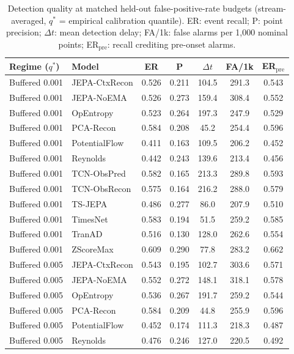 \begin{table}[t]
\centering
\scriptsize
\caption{Detection quality at matched held-out false-positive-rate budgets (stream-averaged, $q^*$ = empirical calibration quantile). ER: event recall; P: point precision; $\Delta t$: mean detection delay; FA/1k: false alarms per 1{,}000 nominal points; ER$_{\mathrm{pre}}$: recall crediting pre-onset alarms.}\label{tab:matched_fpr}
\begin{tabular}{@{}llccccc@{}}
\toprule
Regime ($q^*$) & Model & ER & P & $\Delta t$ & FA/1k & ER$_{\mathrm{pre}}$ \\
\midrule
Buffered 0.001 & JEPA-CtxRecon & 0.526 & 0.211 & 104.5 & 291.3 & 0.543 \\
Buffered 0.001 & JEPA-NoEMA & 0.526 & 0.273 & 159.4 & 308.4 & 0.552 \\
Buffered 0.001 & OpEntropy & 0.523 & 0.264 & 197.3 & 247.9 & 0.529 \\
Buffered 0.001 & PCA-Recon & 0.584 & 0.208 & 45.2 & 254.4 & 0.596 \\
Buffered 0.001 & PotentialFlow & 0.411 & 0.163 & 109.5 & 206.2 & 0.452 \\
Buffered 0.001 & Reynolds & 0.442 & 0.243 & 139.6 & 213.4 & 0.456 \\
Buffered 0.001 & TCN-ObsPred & 0.582 & 0.165 & 213.3 & 289.8 & 0.593 \\
Buffered 0.001 & TCN-ObsRecon & 0.575 & 0.164 & 216.2 & 288.0 & 0.579 \\
Buffered 0.001 & TS-JEPA & 0.486 & 0.277 & 86.0 & 207.9 & 0.510 \\
Buffered 0.001 & TimesNet & 0.583 & 0.194 & 51.5 & 259.2 & 0.585 \\
Buffered 0.001 & TranAD & 0.516 & 0.130 & 128.0 & 262.6 & 0.554 \\
Buffered 0.001 & ZScoreMax & 0.609 & 0.290 & 77.8 & 283.2 & 0.662 \\
Buffered 0.005 & JEPA-CtxRecon & 0.543 & 0.195 & 102.7 & 303.6 & 0.571 \\
Buffered 0.005 & JEPA-NoEMA & 0.552 & 0.272 & 148.1 & 318.1 & 0.578 \\
Buffered 0.005 & OpEntropy & 0.536 & 0.267 & 191.7 & 259.2 & 0.544 \\
Buffered 0.005 & PCA-Recon & 0.584 & 0.209 & 44.8 & 255.9 & 0.596 \\
Buffered 0.005 & PotentialFlow & 0.452 & 0.174 & 111.3 & 218.3 & 0.487 \\
Buffered 0.005 & Reynolds & 0.476 & 0.246 & 127.0 & 220.5 & 0.492 \\

\end{tabular}
\end{table}
